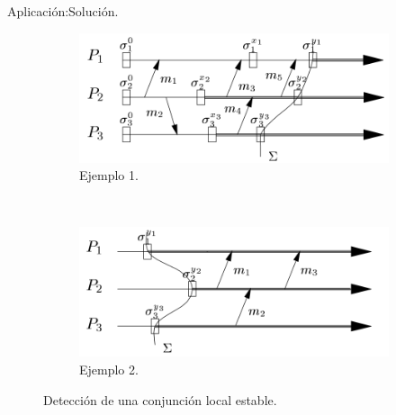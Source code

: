 \begin{frame}[fragile]{Aplicación:}{Solución.}
  \justifying
\begin{figure}
    \centering
    \begin{subfigure}[b]{0.5\textwidth}
        \includegraphics[width=\textwidth]{./Ejemplo1}
        \caption{Ejemplo 1.}
        \label{fig:ejemplo1}
    \end{subfigure}
    ~ %
    \begin{subfigure}[b]{0.5\textwidth}
        \includegraphics[width=\textwidth]{./Ejemplo2}
        \caption{Ejemplo 2.}
        \label{fig:ejemplo2}
    \end{subfigure}
    \caption{Detección de una conjunción local estable.}\label{fig:Deteccion.}
\end{figure}
\end{frame}

